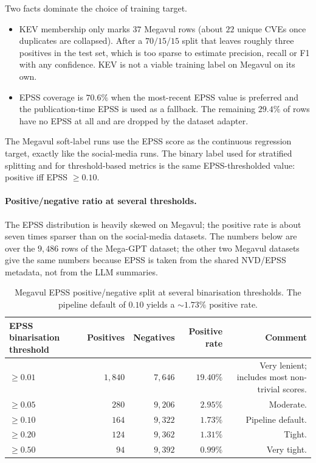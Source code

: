 \documentclass[11pt]{article}
\begin{document}
Two facts dominate the choice of training target.

\begin{itemize}
    \item KEV membership only marks $37$ Megavul rows (about $22$
    unique CVEs once duplicates are collapsed). After a $70/15/15$
    split that leaves roughly three positives in the test set, which
    is too sparse to estimate precision, recall or F1 with any
    confidence. KEV is not a viable training label on Megavul on its
    own.
    \item EPSS coverage is $70.6\%$ when the most-recent EPSS value
    is preferred and the publication-time EPSS is used as a fallback.
    The remaining $29.4\%$ of rows have no EPSS at all and are dropped
    by the dataset adapter.
\end{itemize}

The Megavul soft-label runs use the EPSS score as the continuous
regression target, exactly like the social-media runs. The binary
label used for stratified splitting and for threshold-based metrics
is the same EPSS-thresholded value: positive iff EPSS $\geq 0.10$.

\paragraph{Positive/negative ratio at several thresholds.}
The EPSS distribution is heavily skewed on Megavul; the positive rate
is about seven times sparser than on the social-media datasets. The
numbers below are over the $9{,}486$ rows of the Mega-GPT dataset; the
other two Megavul datasets give the same numbers because EPSS is taken
from the shared NVD/EPSS metadata, not from the LLM summaries.

\begin{table}[h]
\centering
\small
\begin{tabular}{lrrrr}
\toprule
EPSS binarisation threshold & Positives & Negatives & Positive rate & Comment \\
\midrule
$\geq 0.01$ & $1{,}840$ & $7{,}646$ & $19.40\%$ & Very lenient; includes most non-trivial scores. \\
$\geq 0.05$ & $280$     & $9{,}206$ & $2.95\%$  & Moderate. \\
$\geq 0.10$ & $164$     & $9{,}322$ & $1.73\%$  & Pipeline default. \\
$\geq 0.20$ & $124$     & $9{,}362$ & $1.31\%$  & Tight. \\
$\geq 0.50$ & $94$      & $9{,}392$ & $0.99\%$  & Very tight. \\
\bottomrule
\end{tabular}
\caption{Megavul EPSS positive/negative split at several binarisation
thresholds. The pipeline default of $0.10$ yields a $\sim 1.73\%$
positive rate.}
\end{table}
\end{document}

